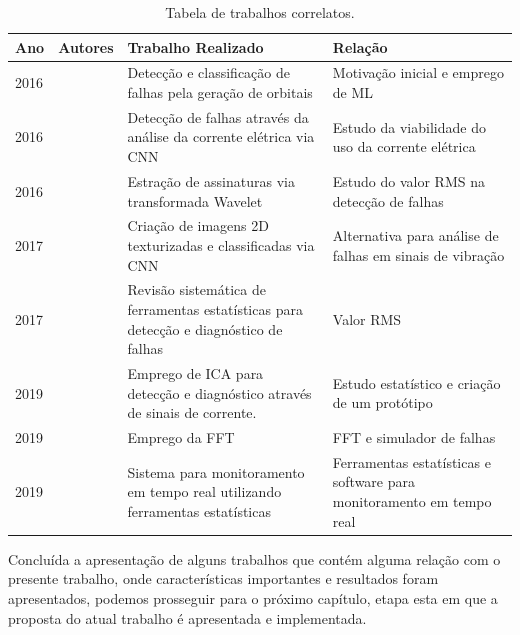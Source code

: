 \begin{table}[H]
    \caption{Tabela de trabalhos correlatos.}
    \label{tab:correlatos}
    \centering%
        \begin{tabular}{|p{}|p{}|p{}|p{}|}
            \hline
            Ano  & Autores                      & Trabalho Realizado                                                                    & Relação                        \\ \hline
            2016 & \cite{Jeong2016}             & Detecção e classificação de falhas pela geração de orbitais                           & Motivação inicial e emprego de ML \\ \hline
            2016 & \cite{Ince2016}              & Detecção de falhas através da análise da corrente elétrica via CNN                    & Estudo da viabilidade do uso da corrente elétrica \\ \hline
            2016 & \cite{Hemmati2016a}          & Estração de assinaturas via transformada Wavelet                                      & Estudo do valor RMS na detecção de falhas \\ \hline
            2017 & \cite{Hatami2017}            & Criação de imagens 2D texturizadas e classificadas via CNN                            & Alternativa para análise de falhas em sinais de vibração \\ \hline
            2017 & \cite{Caesarendra2017}       & Revisão sistemática de ferramentas estatísticas para detecção e diagnóstico de falhas & Valor RMS \\ \hline
            2019 & \cite{Garcia-Bracamonte2019} & Emprego de ICA para detecção e diagnóstico através de sinais de corrente.             & Estudo estatístico e criação de um protótipo \\ \hline
            2019 & \cite{Azeem2019}             & Emprego da FFT                                                                        & FFT e simulador de falhas \\ \hline
            2019 & \cite{Zhang2019}             & Sistema para monitoramento em tempo real utilizando ferramentas estatísticas          & Ferramentas estatísticas e software para monitoramento em tempo real \\ \hline        
        \end{tabular}
  \end{table}

Concluída a apresentação de alguns trabalhos que contém alguma relação com o presente trabalho, onde características importantes e resultados 
foram apresentados, podemos prosseguir para o próximo capítulo, etapa esta em que a proposta do atual trabalho é apresentada e implementada.